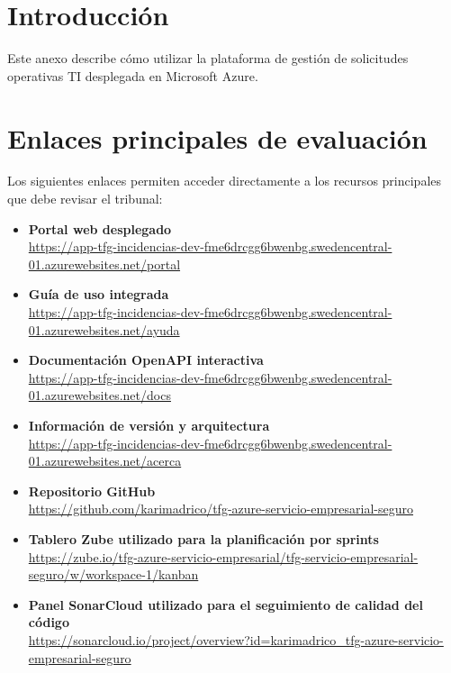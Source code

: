 
\section{Introducción}

Este anexo describe cómo utilizar la plataforma de gestión de solicitudes operativas TI desplegada en Microsoft Azure.

\section{Enlaces principales de evaluación}

Los siguientes enlaces permiten acceder directamente a los recursos principales que debe revisar el tribunal:

\begingroup
\small
\begin{sloppypar}
\begin{itemize}
    \item \textbf{Portal web desplegado}\\
    \url{https://app-tfg-incidencias-dev-fme6drcgg6bwenbg.swedencentral-01.azurewebsites.net/portal}
    \item \textbf{Guía de uso integrada}\\
    \url{https://app-tfg-incidencias-dev-fme6drcgg6bwenbg.swedencentral-01.azurewebsites.net/ayuda}
    \item \textbf{Documentación OpenAPI interactiva}\\
    \url{https://app-tfg-incidencias-dev-fme6drcgg6bwenbg.swedencentral-01.azurewebsites.net/docs}
    \item \textbf{Información de versión y arquitectura}\\
    \url{https://app-tfg-incidencias-dev-fme6drcgg6bwenbg.swedencentral-01.azurewebsites.net/acerca}
    \item \textbf{Repositorio GitHub}\\
    \url{https://github.com/karimadrico/tfg-azure-servicio-empresarial-seguro}
    \item \textbf{Tablero Zube utilizado para la planificación por sprints}\\
    \url{https://zube.io/tfg-azure-servicio-empresarial/tfg-servicio-empresarial-seguro/w/workspace-1/kanban}
    \item \textbf{Panel SonarCloud utilizado para el seguimiento de calidad del código}\\
    \url{https://sonarcloud.io/project/overview?id=karimadrico_tfg-azure-servicio-empresarial-seguro}
\end{itemize}
\end{sloppypar}
\endgroup

